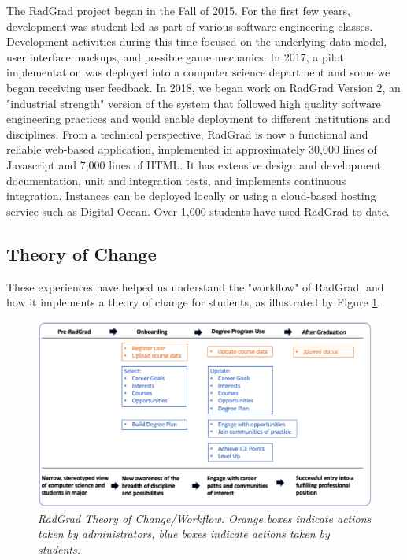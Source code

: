 \documentclass[acmsmall]{acmart}
\begin{document}
The RadGrad project began in the Fall of 2015. For the first few years, development was student-led as part of various software engineering classes. Development activities during this time focused on the underlying data model, user interface mockups, and possible game mechanics. In 2017, a pilot implementation was deployed into a computer science department and some we began receiving user feedback. In 2018, we began work on RadGrad Version 2, an "industrial strength" version of the system that followed high quality software engineering practices and would enable deployment to different institutions and disciplines. From a technical perspective, RadGrad is now a functional and reliable web-based application, implemented in approximately 30,000 lines of Javascript and 7,000 lines of HTML. It has extensive design and development documentation, unit and integration tests, and implements continuous integration. Instances can be deployed locally or using a cloud-based hosting service such as Digital Ocean. Over 1,000 students have used RadGrad to date.

\subsection{Theory of Change}

These experiences have helped us understand the "workflow" of RadGrad, and how it implements a theory of change for students, as illustrated by Figure \ref{fig:theory-of-change}.

\begin{figure}[ht]
\centering
\includegraphics[width=\linewidth]{images/radgrad-workflow.eps}
\caption{\em RadGrad Theory of Change/Workflow. Orange boxes indicate actions taken by administrators, blue boxes indicate actions taken by students.}
\label{fig:theory-of-change}
\end{figure}
\end{document}
